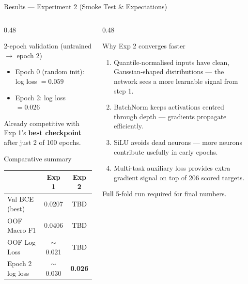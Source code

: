 \documentclass[aspectratio=169, 10pt]{beamer}
\begin{document}
\begin{frame}{Results — Experiment 2 (Smoke Test \& Expectations)}
  \begin{columns}[T]
    \begin{column}{0.48\textwidth}
      \begin{block}{2-epoch validation (untrained $\to$ epoch 2)}
        \begin{itemize}
          \item Epoch 0 (random init): log loss $= 0.059$
          \item Epoch 2: log loss $= \mathbf{0.026}$
        \end{itemize}
        Already competitive with Exp 1's \textbf{best checkpoint}
        after just 2 of 100 epochs.
      \end{block}
      \vspace{0.5em}
      \begin{block}{Comparative summary}
        \small
        \begin{tabular}{lcc}
          \toprule
          & \textbf{Exp 1} & \textbf{Exp 2} \\
          \midrule
          Val BCE (best) & 0.0207 & TBD \\
          OOF Macro F1   & 0.0406 & TBD \\
          OOF Log Loss   & $\sim$0.021 & TBD \\
          Epoch 2 log loss & $\sim$0.030 & \textbf{0.026} \\
          \bottomrule
        \end{tabular}
      \end{block}
    \end{column}
    \begin{column}{0.48\textwidth}
      \begin{exampleblock}{Why Exp 2 converges faster}
        \begin{enumerate}
          \item Quantile-normalised inputs have clean,
                Gaussian-shaped distributions — the network
                sees a more learnable signal from step 1.
          \item BatchNorm keeps activations centred through
                depth — gradients propagate efficiently.
          \item SiLU avoids dead neurons — more neurons
                contribute usefully in early epochs.
          \item Multi-task auxiliary loss provides extra
                gradient signal on top of 206 scored targets.
        \end{enumerate}
      \end{exampleblock}
      Full 5-fold run required for final numbers.
    \end{column}
  \end{columns}
\end{frame}
\end{document}
